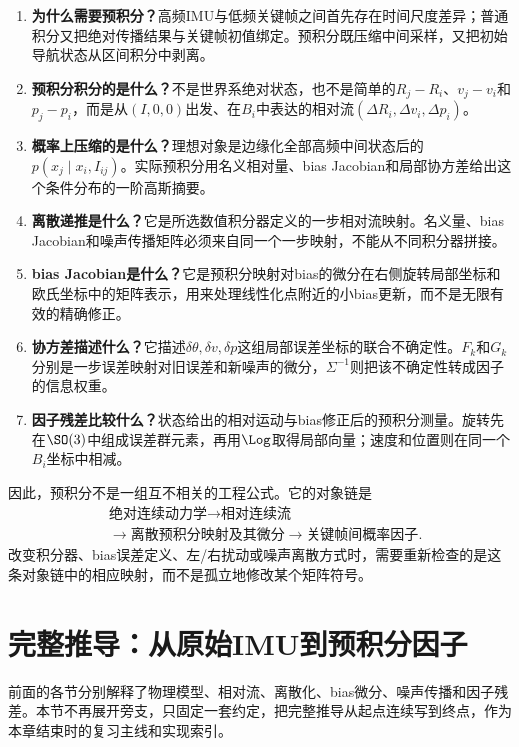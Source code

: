 \begin{enumerate}
    \item \textbf{为什么需要预积分？}高频IMU与低频关键帧之间首先存在时间尺度差异；普通积分又把绝对传播结果与关键帧初值绑定。预积分既压缩中间采样，又把初始导航状态从区间积分中剥离。
    \item \textbf{预积分积分的是什么？}不是世界系绝对状态，也不是简单的$R_j-R_i$、$v_j-v_i$和$p_j-p_i$，而是从$(I,0,0)$出发、在$B_i$中表达的相对流$(\Delta R_i,\Delta v_i,\Delta p_i)$。
    \item \textbf{概率上压缩的是什么？}理想对象是边缘化全部高频中间状态后的$p(x_j\mid x_i,I_{ij})$。实际预积分用名义相对量、bias Jacobian和局部协方差给出这个条件分布的一阶高斯摘要。
    \item \textbf{离散递推是什么？}它是所选数值积分器定义的一步相对流映射。名义量、bias Jacobian和噪声传播矩阵必须来自同一个一步映射，不能从不同积分器拼接。
    \item \textbf{bias Jacobian是什么？}它是预积分映射对bias的微分在右侧旋转局部坐标和欧氏坐标中的矩阵表示，用来处理线性化点附近的小bias更新，而不是无限有效的精确修正。
    \item \textbf{协方差描述什么？}它描述$\delta\theta,\delta v,\delta p$这组局部误差坐标的联合不确定性。$F_k$和$G_k$分别是一步误差映射对旧误差和新噪声的微分，$\Sigma^{-1}$则把该不确定性转成因子的信息权重。
    \item \textbf{因子残差比较什么？}状态给出的相对运动与bias修正后的预积分测量。旋转先在$\SO(3)$中组成误差群元素，再用$\Log$取得局部向量；速度和位置则在同一个$B_i$坐标中相减。
\end{enumerate}

因此，预积分不是一组互不相关的工程公式。它的对象链是
\[
\boxed{
\begin{aligned}
&\text{绝对连续动力学}
\longrightarrow
\text{相对连续流}\\
&\longrightarrow
\text{离散预积分映射及其微分}
\longrightarrow
\text{关键帧间概率因子}.
\end{aligned}
}
\]
改变积分器、bias误差定义、左/右扰动或噪声离散方式时，需要重新检查的是这条对象链中的相应映射，而不是孤立地修改某个矩阵符号。

\section{完整推导：从原始IMU到预积分因子}

前面的各节分别解释了物理模型、相对流、离散化、bias微分、噪声传播和因子残差。本节不再展开旁支，只固定一套约定，把完整推导从起点连续写到终点，作为本章结束时的复习主线和实现索引。

